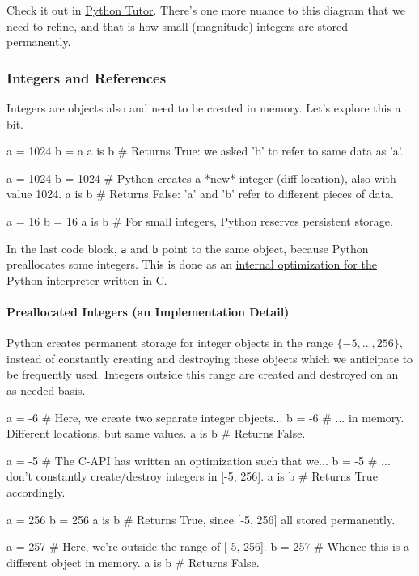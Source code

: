 \documentclass[12pt,letterpaper,twoside]{article}
\begin{document}
Check it out in
\href{http://www.pythontutor.com/visualize.html\#code=a\%20\%3D\%20\%5B42,\%2019,\%2073\%5D\%0Ab\%20\%3D\%20a\%0Aprint(a\%20is\%20b\%29\%0Ab\%20\%3D\%20\%5B42,\%2019,\%2073\%5D\%0Aprint(a\%20is\%20b\%29\%0A\&cumulative=false\&curInstr=0\&heapPrimitives=false\&mode=display\&origin=opt-frontend.js\&py=3\&rawInputLstJSON=\%5B\%5D\&textReferences=false}{Python Tutor}.
There's one more nuance to this diagram that we need to refine, and that is how small (magnitude) integers are stored permanently.

\subsubsection{Integers and References}
Integers are objects also and need to be created in memory. Let's
explore this a bit.

\begin{python}
a = 1024
b = a
a is b     # Returns True: we asked 'b' to refer to same data as 'a'.
\end{python}

\begin{python}
a = 1024   
b = 1024   # Python creates a *new* integer (diff location), also with value 1024.
a is b     # Returns False: 'a' and 'b' refer to different pieces of data.

a = 16
b = 16
a is b     # For small integers, Python reserves persistent storage.
\end{python}

In the last code block, \texttt{a} and \texttt{b} point to the same
object, because Python preallocates some integers. This is done as an 
\href{https://docs.python.org/3/c-api/long.html}{internal optimization for the Python interpreter written in C}.

\vspace{-2ex}
\paragraph{Preallocated Integers (an Implementation Detail)}
Python creates permanent storage for integer objects in the range $\{-5, ..., 256\}$, instead of 
constantly creating and destroying these objects which we anticipate to be frequently used.
Integers outside this range are created and destroyed on an as-needed basis.

\begin{python}
a = -6   # Here, we create two separate integer objects...
b = -6   # ... in memory. Different locations, but same values.
a is b   # Returns False.

a = -5   # The C-API has written an optimization such that we...
b = -5   # ... don't constantly create/destroy integers in [-5, 256].
a is b   # Returns True accordingly.

a = 256
b = 256
a is b   # Returns True, since [-5, 256] all stored permanently.

a = 257  # Here, we're outside the range of [-5, 256].
b = 257  # Whence this is a different object in memory.
a is b   # Returns False.
\end{python}
\end{document}
